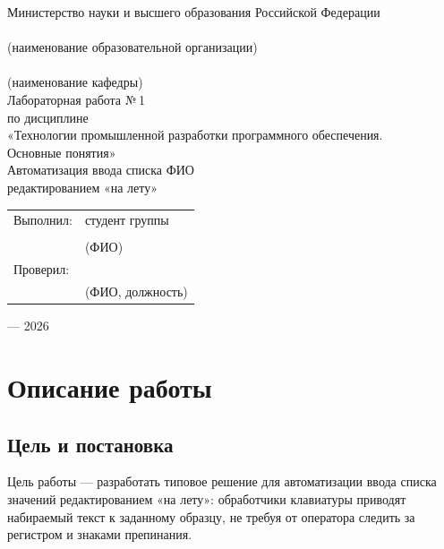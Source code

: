 \documentclass[a4paper,14pt]{extarticle}
\begin{document}
\begin{titlepage}
\centering
Министерство науки и высшего образования Российской Федерации\\[6pt]
\underline{\hspace{0.86\textwidth}}\\
(наименование образовательной организации)\\[18pt]
\underline{\hspace{0.86\textwidth}}\\
(наименование кафедры)\\[48pt]
{\Large Лабораторная работа №\,1}\\[10pt]
по дисциплине\\
«Технологии промышленной разработки программного обеспечения.\\
Основные понятия»\\[18pt]
{\large Автоматизация ввода списка ФИО\\
редактированием «на лету»}\\[56pt]
\begin{flushleft}
\hspace{0.42\textwidth}
\begin{tabular}{ll}
Выполнил: & студент группы \underline{\hspace{2.2cm}}\\[8pt]
& \underline{\hspace{5.2cm}}\\
& (ФИО)\\[16pt]
Проверил: & \underline{\hspace{5.2cm}}\\
& (ФИО, должность)\\
\end{tabular}
\end{flushleft}
\vfill
\underline{\hspace{4cm}} --- 2026
\end{titlepage}

\tableofcontents
\newpage

\section{Описание работы}

\subsection{Цель и постановка}

Цель работы --- разработать типовое решение для автоматизации ввода списка значений редактированием «на лету»: обработчики клавиатуры приводят набираемый текст к заданному образцу, не требуя от оператора следить за регистром и знаками препинания.
\end{document}
